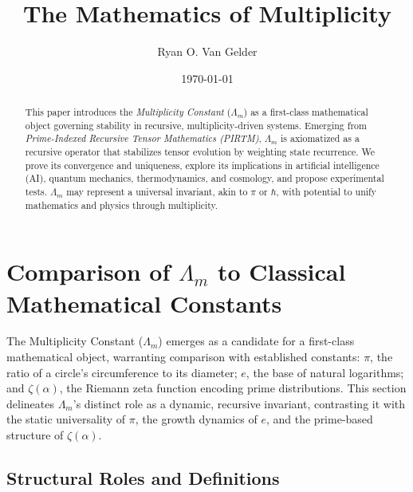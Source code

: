 \documentclass{article}
\theoremstyle{plain}
\theoremstyle{definition}
\theoremstyle{remark}
\begin{document}
\title{The Mathematics of Multiplicity}

\author{Ryan O. Van Gelder}
\date{\today}

\maketitle
\nolinenumbers

\begin{abstract}
This paper introduces the \textit{Multiplicity Constant} ($\Lambda_m$) as a first-class mathematical object governing stability in recursive, multiplicity-driven systems. Emerging from \textit{Prime-Indexed Recursive Tensor Mathematics (PIRTM)}, $\Lambda_m$ is axiomatized as a recursive operator that stabilizes tensor evolution by weighting state recurrence. We prove its convergence and uniqueness, explore its implications in artificial intelligence (AI), quantum mechanics, thermodynamics, and cosmology, and propose experimental tests. $\Lambda_m$ may represent a universal invariant, akin to $\pi$ or $\hbar$, with potential to unify mathematics and physics through multiplicity.
\end{abstract}

\section{Comparison of \(\Lambda_m\) to Classical Mathematical Constants}

The Multiplicity Constant (\(\Lambda_m\)) emerges as a candidate for a first-class mathematical object, warranting comparison with established constants: \(\pi\), the ratio of a circle's circumference to its diameter; \(e\), the base of natural logarithms; and \(\zeta(\alpha)\), the Riemann zeta function encoding prime distributions. This section delineates \(\Lambda_m\)'s distinct role as a dynamic, recursive invariant, contrasting it with the static universality of \(\pi\), the growth dynamics of \(e\), and the prime-based structure of \(\zeta(\alpha)\).

\subsection{Structural Roles and Definitions}
\end{document}
